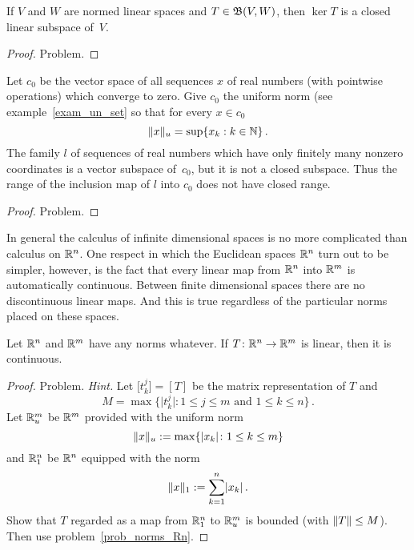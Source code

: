 \begin{prop} If $V$ and $W$ are normed linear spaces and $T \in \mathfrak{B}(V,W)$, then $\ker T$
is a closed linear subspace of~$V$.
\end{prop}

\begin{proof} Problem.   \ns  \end{proof}

\begin{exam} Let $c_0$ be the vector space of all sequences $x$ of real numbers (with pointwise
operations) which converge to zero. Give $c_0$ the uniform norm (see example~\ref{exam_un_set}
so that for every $x \in c_0$
  \[ \lVert x\rVert_u = \sup\{x_k: k \in \mathbb{N}\}\,. \]
The family $l$ of sequences of real numbers which have only finitely many nonzero coordinates
is a vector subspace of~$c_0$, but it is not a closed subspace.  Thus the range of the
inclusion map of $l$ into $c_0$ does not have closed range.
\end{exam}

\begin{proof} Problem.  \ns  \end{proof}

In general the calculus of infinite dimensional spaces is no more complicated than calculus on
$\mathbb{R}^n$.  One respect in which the Euclidean spaces $\mathbb{R}^n$ turn out to be simpler, however, is
the fact that every linear map from $\mathbb{R}^n$ into $\mathbb{R}^m$ is automatically continuous.  Between
finite dimensional spaces there are no discontinuous linear maps.  And this is true regardless
of the particular norms placed on these spaces.

\begin{prop}\label{prop_fd_cont}  Let $\mathbb{R}^n$ and $\mathbb{R}^m$ have any norms whatever.  If
$T \colon \mathbb{R}^n \rightarrow \mathbb{R}^m$ is linear, then it is continuous.
\end{prop}

\begin{proof} Problem.  \emph{Hint.}   Let $\bigl[t_k^j\bigr] = [T]$ be the matrix representation
of $T$ and
  \[ M = \max\{\bigl| t_k^j \bigr| \colon 1 \le j \le m \text{ and } 1 \le k \le n\}\,. \]
Let $\mathbb{R}_u^m$ be $\mathbb{R}^m$ provided with the uniform norm
  \[ \lVert x\rVert_u := \max\{\lvert x_k\rvert \colon 1 \le k \le m\} \]
and $\mathbb{R}_1^n$ be $\mathbb{R}^n$ equipped with the norm
  \[ \lVert x\rVert_1 := \sum_{k=1}^n \lvert x_k\rvert\,. \]
Show that $T$ regarded as a map from $\mathbb{R}_1^n$ to $\mathbb{R}_u^m$ is bounded (with $\lVert T\rVert \le M$).
Then use problem~\ref{prob_norms_Rn}.  \ns   \end{proof}

